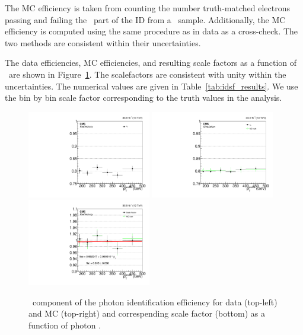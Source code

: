 The MC efficiency is taken from counting the number truth-matched electrons passing and failing the \egamma\ part of the ID from a \Zee\ sample. 
Additionally, the MC efficiency is computed using the same procedure as in data as a cross-check. The two methods are consistent within their uncertainties. 

The data efficiencies, MC efficiencies, and resulting scale factors as a function of \pt\ are shown in Figure~\ref{fig:idsf_results}. 
The scalefactors are consistent with unity within the uncertainties. 
The numerical values are given in Table~\ref{tab:idsf_results}. 
We use the bin by bin scale factor corresponding to the truth values in the analysis.

\begin{figure}[htbp]
  \begin{center}
    \includegraphics[width=0.48\textwidth]{Calibration/Figures/idsf/eff_data_ptalt.pdf}
    \includegraphics[width=0.48\textwidth]{Calibration/Figures/idsf/eff_mc_ptalt.pdf}
    \includegraphics[width=0.48\textwidth]{Calibration/Figures/idsf/scaleFactor_ptalt.pdf}
    \caption{
      \egamma\ component of the photon identification efficiency for data (top-left) and MC (top-right) and correspending scale factor (bottom) as a function of photon \pt.
    }
    \label{fig:idsf_results}
  \end{center}
\end{figure}
 
